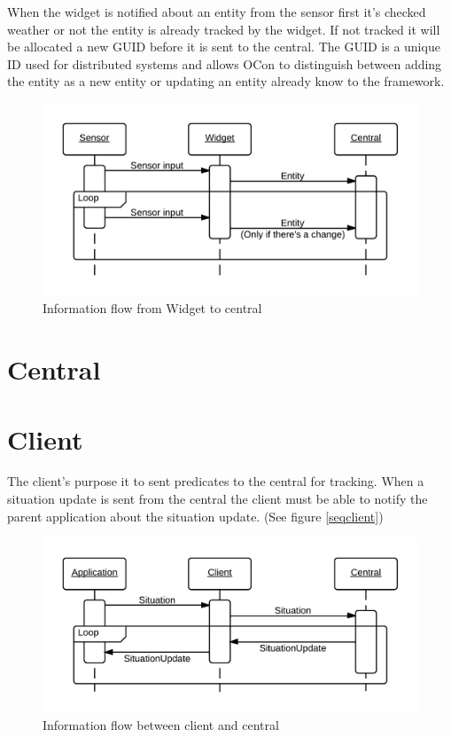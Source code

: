 \documentclass[../report.tex]{subfiles}
\begin{document}
When the widget is notified about an entity from the sensor first it's checked weather or not the entity is already tracked by the widget. If not tracked it will be allocated a new GUID before it is sent to the central. The GUID is a unique ID used for distributed systems and allows OCon to distinguish between adding the entity as a new entity or updating an entity already know to the framework.

\begin{figure}
\centering
\includegraphics[width=\linewidth]{sequencediagram-widget.png}
\caption{Information flow from Widget to central}
\label{fig:seqwidget}
\end{figure}


\section{Central}

\section{Client}

The client's purpose it to sent predicates to the central for tracking. When a situation update is sent from the central the client must be able to notify the parent application about the situation update. (See figure \ref{seqclient})

\begin{figure}
\centering
\includegraphics[width=\linewidth]{clientsequencediagram.png}
\caption{Information flow between client and central}
\label{fig:seqclient}
\end{figure}
\end{document}
